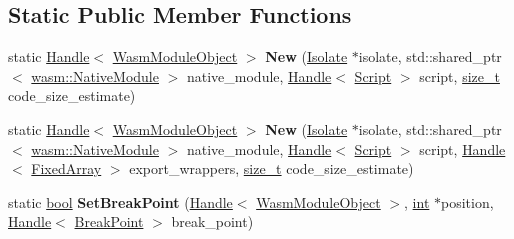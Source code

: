 \subsection*{Static Public Member Functions}
\begin{DoxyCompactItemize}
\item 
\mbox{\label{classv8_1_1internal_1_1WasmModuleObject_a531e34d73ffd285897e5e2c6bf97a7d6}} 
static \mbox{\hyperlink{classv8_1_1internal_1_1Handle}{Handle}}$<$ \mbox{\hyperlink{classv8_1_1internal_1_1WasmModuleObject}{Wasm\+Module\+Object}} $>$ {\bfseries New} (\mbox{\hyperlink{classv8_1_1internal_1_1Isolate}{Isolate}} $\ast$isolate, std\+::shared\+\_\+ptr$<$ \mbox{\hyperlink{classv8_1_1internal_1_1wasm_1_1NativeModule}{wasm\+::\+Native\+Module}} $>$ native\+\_\+module, \mbox{\hyperlink{classv8_1_1internal_1_1Handle}{Handle}}$<$ \mbox{\hyperlink{classv8_1_1internal_1_1Script}{Script}} $>$ script, \mbox{\hyperlink{classsize__t}{size\+\_\+t}} code\+\_\+size\+\_\+estimate)
\item 
\mbox{\label{classv8_1_1internal_1_1WasmModuleObject_a77e0190c1ede044efe18b2a4d1996fb9}} 
static \mbox{\hyperlink{classv8_1_1internal_1_1Handle}{Handle}}$<$ \mbox{\hyperlink{classv8_1_1internal_1_1WasmModuleObject}{Wasm\+Module\+Object}} $>$ {\bfseries New} (\mbox{\hyperlink{classv8_1_1internal_1_1Isolate}{Isolate}} $\ast$isolate, std\+::shared\+\_\+ptr$<$ \mbox{\hyperlink{classv8_1_1internal_1_1wasm_1_1NativeModule}{wasm\+::\+Native\+Module}} $>$ native\+\_\+module, \mbox{\hyperlink{classv8_1_1internal_1_1Handle}{Handle}}$<$ \mbox{\hyperlink{classv8_1_1internal_1_1Script}{Script}} $>$ script, \mbox{\hyperlink{classv8_1_1internal_1_1Handle}{Handle}}$<$ \mbox{\hyperlink{classv8_1_1internal_1_1FixedArray}{Fixed\+Array}} $>$ export\+\_\+wrappers, \mbox{\hyperlink{classsize__t}{size\+\_\+t}} code\+\_\+size\+\_\+estimate)
\item 
\mbox{\label{classv8_1_1internal_1_1WasmModuleObject_a6e17a6dce3f954f276f46f1a7421ee0a}} 
static \mbox{\hyperlink{classbool}{bool}} {\bfseries Set\+Break\+Point} (\mbox{\hyperlink{classv8_1_1internal_1_1Handle}{Handle}}$<$ \mbox{\hyperlink{classv8_1_1internal_1_1WasmModuleObject}{Wasm\+Module\+Object}} $>$, \mbox{\hyperlink{classint}{int}} $\ast$position, \mbox{\hyperlink{classv8_1_1internal_1_1Handle}{Handle}}$<$ \mbox{\hyperlink{classv8_1_1internal_1_1BreakPoint}{Break\+Point}} $>$ break\+\_\+point)

\end{DoxyCompactItemize}
